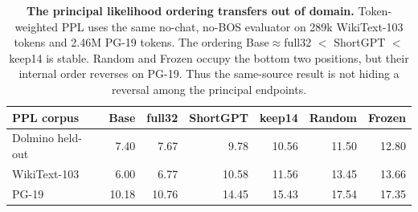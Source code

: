 \begin{table}[t]
\centering
\scriptsize
\setlength{\tabcolsep}{4.2pt}
\begin{tabular}{@{}lrrrrrr@{}}
\toprule
\textbf{PPL corpus} & \textbf{Base} & \textbf{full32} &
\textbf{ShortGPT} & \textbf{keep14} & \textbf{Random} &
\textbf{Frozen} \\
\midrule
Dolmino held-out & 7.40 & 7.67 & 9.78 & 10.56 & 11.50 & 12.80 \\
WikiText-103 & 6.00 & 6.77 & 10.58 & 11.56 & 13.45 & 13.66 \\
PG-19 & 10.18 & 10.76 & 14.45 & 15.43 & 17.54 & 17.35 \\
\bottomrule
\end{tabular}
\caption{\textbf{The principal likelihood ordering transfers out of domain.}
Token-weighted PPL uses the same no-chat, no-BOS evaluator on 289k
WikiText-103 tokens and 2.46M PG-19 tokens. The ordering
Base$\approx$full32 $<$ ShortGPT $<$ keep14 is stable. Random and Frozen occupy
the bottom two positions, but their internal order reverses on PG-19. Thus the
same-source result is not hiding a reversal among the principal endpoints.}
\label{tab:ood-audit}
\end{table}
